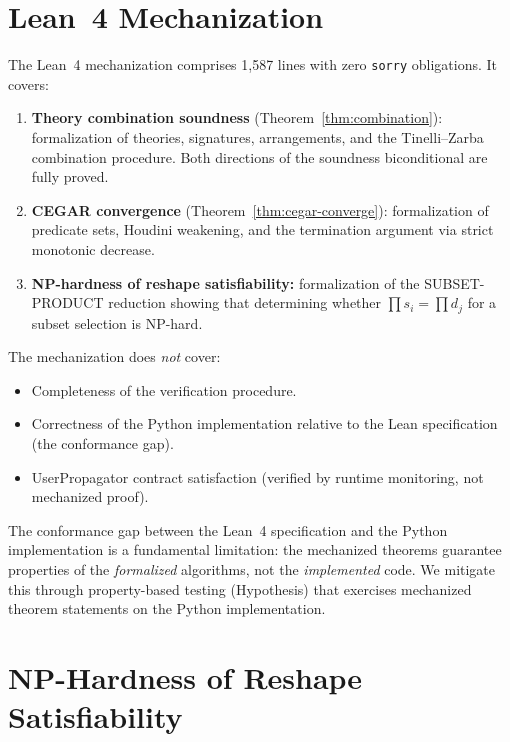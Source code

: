 \documentclass[11pt]{article}
\begin{document}
\section{Lean~4 Mechanization}\label{sec:lean}

The Lean~4 mechanization comprises 1,587 lines with zero
\texttt{sorry} obligations.  It covers:

\begin{enumerate}[leftmargin=2em]
  \item \textbf{Theory combination soundness} (Theorem~\ref{thm:combination}):
    formalization of theories, signatures, arrangements, and the
    Tinelli--Zarba combination procedure.  Both directions of the
    soundness biconditional are fully proved.
  \item \textbf{CEGAR convergence} (Theorem~\ref{thm:cegar-converge}):
    formalization of predicate sets, Houdini weakening, and the
    termination argument via strict monotonic decrease.
  \item \textbf{NP-hardness of reshape satisfiability:}
    formalization of the SUBSET-PRODUCT reduction showing that
    determining whether $\prod s_i = \prod d_j$ for a
    subset selection is NP-hard.
\end{enumerate}

The mechanization does \emph{not} cover:
\begin{itemize}[leftmargin=2em]
  \item Completeness of the verification procedure.
  \item Correctness of the Python implementation relative
    to the Lean specification (the conformance gap).
  \item UserPropagator contract satisfaction (verified by
    runtime monitoring, not mechanized proof).
\end{itemize}

The conformance gap between the Lean~4 specification and the
Python implementation is a fundamental limitation: the
mechanized theorems guarantee properties of the \emph{formalized}
algorithms, not the \emph{implemented} code.  We mitigate this
through property-based testing (Hypothesis) that exercises
mechanized theorem statements on the Python implementation.


\section{NP-Hardness of Reshape Satisfiability}\label{app:reshape-hardness}
\end{document}
